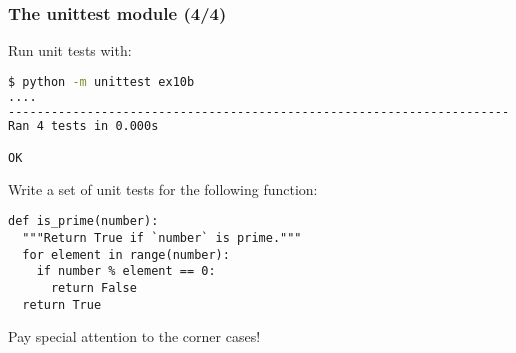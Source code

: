 \documentclass[english,serif,mathserif,xcolor=pdftex,dvipsnames,table]{beamer}
\begin{document}
\begin{frame}[fragile]
\frametitle{The unittest module (4/4)}
Run unit tests with:
\+
  \begin{lstlisting}[language=sh]
$ python -m unittest ex10b
....
----------------------------------------------------------------------
Ran 4 tests in 0.000s

OK
\end{lstlisting}
\end{frame}


\begin{frame}[fragile]
  \begin{exercise}
    Write a set of unit tests for the following function:
\begin{lstlisting}
def is_prime(number):
  """Return True if `number` is prime."""
  for element in range(number):
    if number % element == 0:
      return False
  return True
\end{lstlisting}
    Pay special attention to the corner cases!
  \end{exercise}
\end{frame}
\end{document}
